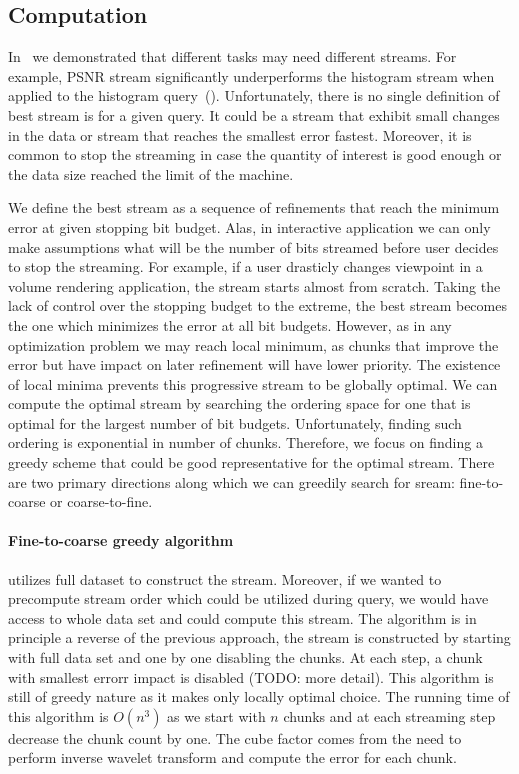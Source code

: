 \subsection{Computation}
In~ we demonstrated that different tasks may need different streams. For
example, PSNR stream significantly underperforms the histogram stream when applied to the histogram
query~(). Unfortunately, there is no single definition of best stream
is for a given query. It could be a stream that exhibit small changes in the data or stream that
reaches the smallest error fastest. Moreover, it is common to stop the streaming in case the
quantity of interest is good enough or the data size reached the limit of the machine.

We define the best stream as a sequence of refinements that reach the minimum error at given
stopping bit budget. Alas, in interactive application we can only make assumptions what will be the
number of bits streamed before user decides to stop the streaming. For example, if a user drasticly
changes viewpoint in a volume rendering application, the stream starts almost from scratch. Taking
the lack of control over the stopping budget to the extreme, the best stream becomes the one which
minimizes the error at all bit budgets. However, as in any optimization problem we may reach local
minimum, as chunks that improve the error but have impact on later refinement will have lower
priority. The existence of local minima prevents this progressive stream to be globally optimal. We
can compute the optimal stream by searching the ordering space for one that is optimal for the
largest number of bit budgets. Unfortunately, finding such ordering is exponential in number of
chunks. Therefore, we focus on finding a greedy scheme that could be good representative for the
optimal stream. There are two primary directions along which we can greedily search for sream:
fine-to-coarse or coarse-to-fine.

\paragraph*{Fine-to-coarse greedy algorithm} utilizes full dataset to construct the stream.
Moreover, if we wanted to precompute stream order which could be utilized during query, we would
have access to whole data set and could compute this stream. The algorithm is in principle a reverse
of the previous approach, the stream is constructed by starting with full data set and one by one
disabling the chunks. At each step, a chunk with smallest errorr impact is disabled (TODO: more
detail). This algorithm is still of greedy nature as it makes only locally optimal choice. The
running time of this algorithm is $O(n^3)$ as we start with $n$ chunks and at each streaming step
decrease the chunk count by one. The cube factor comes from the need to perform inverse wavelet
transform and compute the error for each chunk.

